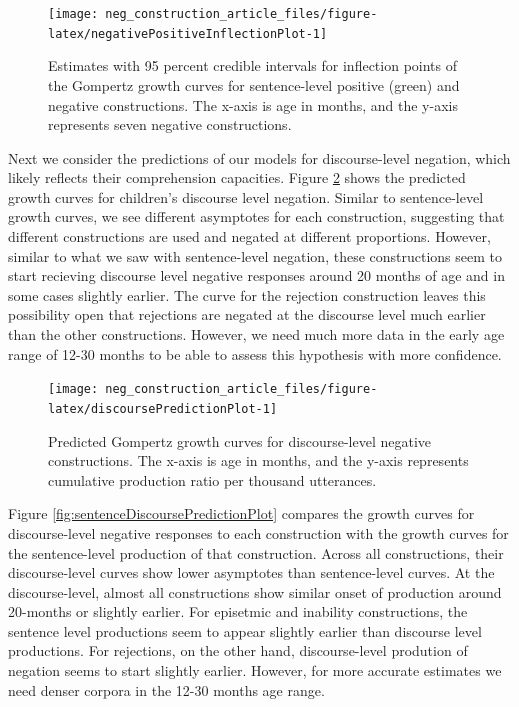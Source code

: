 \documentclass[
  man,floatsintext]{apa6}
\begin{document}
\begin{figure}[H]

{\centering \texttt{[image: neg\_construction\_article\_files/figure-latex/negativePositiveInflectionPlot-1]} 

}

\caption{Estimates with 95 percent credible intervals for inflection points of the Gompertz growth curves for sentence-level positive (green) and negative constructions. The x-axis is age in months, and the y-axis represents seven negative constructions.}\label{fig:negativePositiveInflectionPlot}
\end{figure}

Next we consider the predictions of our models for discourse-level negation, which likely reflects their comprehension capacities. Figure \ref{fig:discoursePredictionPlot} shows the predicted growth curves for children's discourse level negation. Similar to sentence-level growth curves, we see different asymptotes for each construction, suggesting that different constructions are used and negated at different proportions. However, similar to what we saw with sentence-level negation, these constructions seem to start recieving discourse level negative responses around 20 months of age and in some cases slightly earlier. The curve for the rejection construction leaves this possibility open that rejections are negated at the discourse level much earlier than the other constructions. However, we need much more data in the early age range of 12-30 months to be able to assess this hypothesis with more confidence.

\begin{figure}[H]

{\centering \texttt{[image: neg\_construction\_article\_files/figure-latex/discoursePredictionPlot-1]} 

}

\caption{Predicted Gompertz growth curves for discourse-level negative constructions. The x-axis is age in months, and the y-axis represents cumulative production ratio per thousand utterances.}\label{fig:discoursePredictionPlot}
\end{figure}

Figure \ref{fig:sentenceDiscoursePredictionPlot} compares the growth curves for discourse-level negative responses to each construction with the growth curves for the sentence-level production of that construction. Across all constructions, their discourse-level curves show lower asymptotes than sentence-level curves. At the discourse-level, almost all constructions show similar onset of production around 20-months or slightly earlier. For episetmic and inability constructions, the sentence level productions seem to appear slightly earlier than discourse level productions. For rejections, on the other hand, discourse-level prodution of negation seems to start slightly earlier. However, for more accurate estimates we need denser corpora in the 12-30 months age range.
\end{document}
